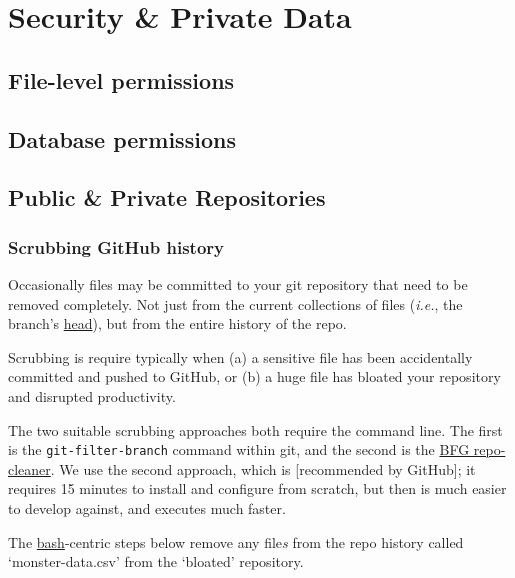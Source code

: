 \documentclass[
]{book}
\begin{document}
\hypertarget{security}{%
\chapter{Security \& Private Data}\label{security}}

\hypertarget{file-level-permissions}{%
\section{File-level permissions}\label{file-level-permissions}}

\hypertarget{database-permissions}{%
\section{Database permissions}\label{database-permissions}}

\hypertarget{public-private-repositories}{%
\section{Public \& Private Repositories}\label{public-private-repositories}}

\hypertarget{scrubbing-github-history}{%
\subsection{Scrubbing GitHub history}\label{scrubbing-github-history}}

Occasionally files may be committed to your git repository that need to be removed completely. Not just from the current collections of files (\emph{i.e.}, the branch's \href{https://git-scm.com/docs/gitglossary\#gitglossary-aiddefHEADaHEAD}{head}), but from the entire history of the repo.

Scrubbing is require typically when (a) a sensitive file has been accidentally committed and pushed to GitHub, or (b) a huge file has bloated your repository and disrupted productivity.

The two suitable scrubbing approaches both require the command line. The first is the \texttt{git-filter-branch} command within git, and the second is the \href{https://rtyley.github.io/bfg-repo-cleaner/}{BFG repo-cleaner}. We use the second approach, which is {[}recommended by GitHub{]}; it requires 15 minutes to install and configure from scratch, but then is much easier to develop against, and executes much faster.

The \href{https://www.gnu.org/software/bash/}{bash}-centric steps below remove any file\emph{s} from the repo history called `monster-data.csv' from the `bloated' repository.
\end{document}
